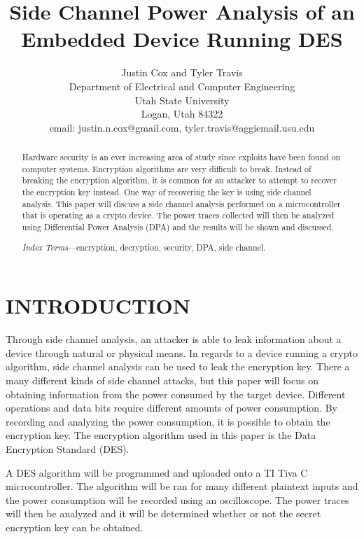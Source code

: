 \documentclass[letterpaper, 10 pt, conference]{ieeeconf}  %
\title{\LARGE \bf
Side Channel Power Analysis of an Embedded Device Running DES  
}
\author{Justin Cox and Tyler Travis
\\ \small{Department of Electrical and Computer Engineering}
\\ \small{Utah State University}
\\ \small{Logan, Utah 84322}
\\ \small{email: justin.n.cox@gmail.com, tyler.travis@aggiemail.usu.edu}
}
\begin{document}
\maketitle
\thispagestyle{empty}
\pagestyle{empty}


\begin{abstract}

Hardware security is an ever increasing area of study since exploits have been found on computer systems.  Encryption algorithms are very difficult to break.  Instead of breaking the encryption algorithm, it is common for an attacker to attempt to recover the encryption key instead.  One way of recovering the key is using side channel analysis.  This paper will discuss a side channel analysis performed on a microcontroller that is operating as a crypto device.  The power traces collected will then be analyzed using Differential Power Analysis (DPA) and the results will be shown and discussed.

\emph{Index Terms}---encryption, decryption, security, DPA, side channel.

\end{abstract}

\section{INTRODUCTION}

Through side channel analysis, an attacker is able to leak information   about a device through natural or physical means.  In regards to a device running a crypto algorithm, side channel analysis can be used to leak the encryption key.  There a many different kinds of side channel attacks, but this paper will focus on obtaining information from the power consumed by the target device.  Different operations and data bits require different amounts of power consumption.  By recording and analyzing the power consumption, it is possible to obtain the encryption key.  The encryption algorithm used in this paper is the Data Encryption Standard (DES).

A DES algorithm will be programmed and uploaded onto a TI Tiva C microcontroller.  The algorithm will be ran for many different plaintext inputs and the power consumption will be recorded using an oscilloscope.  The power traces will then be analyzed and it will be determined whether or not the secret encryption key can be obtained.  
\end{document}
